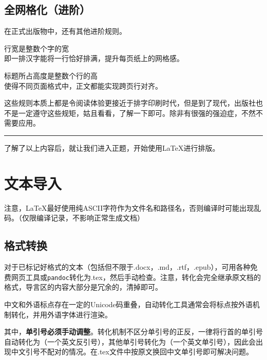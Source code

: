 \documentclass[10pt,openany]{book}
\begin{document}
\begin{sloppypar}
    \section{全网格化（进阶）}

    在正式出版物中，还有其他进阶规则。

    \begin{tightenum}
        \item   行宽是整数个字的宽\\  即一排汉字能将一行恰好排满，提升每页纸上的网格感。
        \item   标题所占高度是整数个行的高\\  使得不同页面格式中，正文都能实现跨页行对齐。
    \end{tightenum}

    这些规则本质上都是令阅读体验更接近于排字印刷时代，但是到了现代，出版社也不是一定遵守这些规矩，姑且看看，了解一下即可。除非有很强的强迫症，不然不需要应用。

    \begin{center}\rule{0.5\linewidth}{0.5pt}\end{center}

    了解了以上内容后，就让我们进入正题，开始使用{\LaTeX}进行排版。

    \chapter{文本导入}

    注意，{\LaTeX}最好使用纯ASCII字符作为文件名和路径名，否则编译时可能出现乱码。（仅限编译记录，不影响正常生成文档）

    \section{格式转换}

    对于已标记好格式的文本（包括但不限于.docx，.md，.rtf，.epub），可用各种免费网页工具或\texttt{pandoc}转化为.tex，然后手动检查。注意，转化会完全继承原文档的格式，导言区的内容大部分是冗余的，清掉即可。

    中文和外语标点存在一定的Unicode码重叠，自动转化工具通常会将标点按外语机制转化，并用外语字体进行渲染。

    其中，\textbf{单引号必须手动调整}。转化机制不区分单引号的正反，一律将行首的单引号自动转化为\texttt{\textasciigrave{}}（一个英文反引号），其他单引号转化为\texttt{\textquotesingle{}}（一个英文单引号），因此会出现中文引号不配对的情况。在.tex文件中按原文换回中文单引号即可解决问题。


\end{sloppypar}
\end{document}

